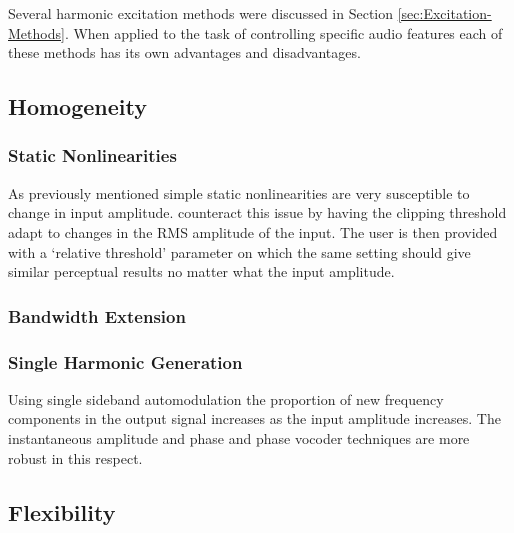 
	Several harmonic excitation methods were discussed in Section \ref{sec:Excitation-Methods}. When applied to the 
	task of controlling specific audio features each of these methods has its own advantages and disadvantages.

	\subsection{Homogeneity}
	\label{sec:FeatureControl-Homogeneity}

		\subsubsection*{Static Nonlinearities}		
			As previously mentioned simple static nonlinearities are very susceptible to change in input 
			amplitude. \citet{deman2014adaptive} counteract this issue by having the clipping threshold adapt 
			to changes in the RMS amplitude of the input. The user is then provided with a `relative threshold' 
			parameter on which the same setting should give similar perceptual results no matter what the input 
			amplitude.


		\subsubsection*{Bandwidth Extension}
			
		\subsubsection*{Single Harmonic Generation}
			Using single sideband automodulation the proportion of new frequency components in the output 
			signal increases as the input amplitude increases. The instantaneous amplitude and phase and phase 
			vocoder techniques are more robust in this respect.

	\subsection{Flexibility}
	\label{sec:FeatureControl-Flexibility}


